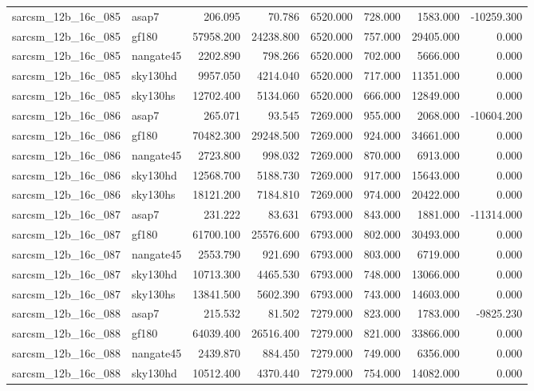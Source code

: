 \begin{tabular}{llrrrrrr}
sarcsm\_12b\_16c\_085 & asap7 & 206.095 & 70.786 & 6520.000 & 728.000 & 1583.000 & -10259.300 \\
sarcsm\_12b\_16c\_085 & gf180 & 57958.200 & 24238.800 & 6520.000 & 757.000 & 29405.000 & 0.000 \\
sarcsm\_12b\_16c\_085 & nangate45 & 2202.890 & 798.266 & 6520.000 & 702.000 & 5666.000 & 0.000 \\
sarcsm\_12b\_16c\_085 & sky130hd & 9957.050 & 4214.040 & 6520.000 & 717.000 & 11351.000 & 0.000 \\
sarcsm\_12b\_16c\_085 & sky130hs & 12702.400 & 5134.060 & 6520.000 & 666.000 & 12849.000 & 0.000 \\
sarcsm\_12b\_16c\_086 & asap7 & 265.071 & 93.545 & 7269.000 & 955.000 & 2068.000 & -10604.200 \\
sarcsm\_12b\_16c\_086 & gf180 & 70482.300 & 29248.500 & 7269.000 & 924.000 & 34661.000 & 0.000 \\
sarcsm\_12b\_16c\_086 & nangate45 & 2723.800 & 998.032 & 7269.000 & 870.000 & 6913.000 & 0.000 \\
sarcsm\_12b\_16c\_086 & sky130hd & 12568.700 & 5188.730 & 7269.000 & 917.000 & 15643.000 & 0.000 \\
sarcsm\_12b\_16c\_086 & sky130hs & 18121.200 & 7184.810 & 7269.000 & 974.000 & 20422.000 & 0.000 \\
sarcsm\_12b\_16c\_087 & asap7 & 231.222 & 83.631 & 6793.000 & 843.000 & 1881.000 & -11314.000 \\
sarcsm\_12b\_16c\_087 & gf180 & 61700.100 & 25576.600 & 6793.000 & 802.000 & 30493.000 & 0.000 \\
sarcsm\_12b\_16c\_087 & nangate45 & 2553.790 & 921.690 & 6793.000 & 803.000 & 6719.000 & 0.000 \\
sarcsm\_12b\_16c\_087 & sky130hd & 10713.300 & 4465.530 & 6793.000 & 748.000 & 13066.000 & 0.000 \\
sarcsm\_12b\_16c\_087 & sky130hs & 13841.500 & 5602.390 & 6793.000 & 743.000 & 14603.000 & 0.000 \\
sarcsm\_12b\_16c\_088 & asap7 & 215.532 & 81.502 & 7279.000 & 823.000 & 1783.000 & -9825.230 \\
sarcsm\_12b\_16c\_088 & gf180 & 64039.400 & 26516.400 & 7279.000 & 821.000 & 33866.000 & 0.000 \\
sarcsm\_12b\_16c\_088 & nangate45 & 2439.870 & 884.450 & 7279.000 & 749.000 & 6356.000 & 0.000 \\
sarcsm\_12b\_16c\_088 & sky130hd & 10512.400 & 4370.440 & 7279.000 & 754.000 & 14082.000 & 0.000 \\

\end{tabular}

